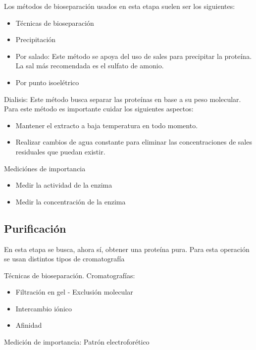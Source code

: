 Los métodos de bioseparación usados en esta etapa suelen ser los siguientes:

\begin{itemize}
    \item Técnicas de bioseparación
    \item Precipitación
    \item Por salado: Este método se apoya del uso de sales para precipitar la proteína. La sal más recomendada es el sulfato de amonio.
    \item Por punto isoelétrico     %
\end{itemize}

Dialisis: Este método busca separar las proteínas en base a su peso molecular. Para este método es importante cuidar los siguientes aspectos:

\begin{itemize}
    \item Mantener el extracto a baja temperatura en todo momento.
    \item Realizar cambios de agua constante para eliminar las concentraciones de sales residuales que puedan existir.
\end{itemize}

 Mediciónes de importancia
 
\begin{itemize}
    \item Medir la actividad de la enzima
    \item Medir la concentración de la enzima
\end{itemize}

\subsection{Purificación}

En esta etapa se busca, ahora sí, obtener una proteína pura.
Para esta operación se usan distintos tipos de cromatografía

Técnicas de bioseparación. Cromatografías:

\begin{itemize}
    \item Filtración en gel - Exclusión molecular
    \item Intercambio iónico
    \item Afinidad
\end{itemize}

Medición de importancia: Patrón electroforético